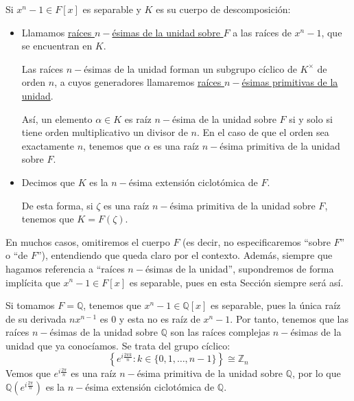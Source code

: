 \begin{definicion}
    Si $x^n-1\in F[x]$ es separable y $K$ es su cuerpo de descomposición:
    \begin{itemize}
        \item Llamamos \underline{raíces $n-$ésimas de la unidad sobre $F$} a las raíces de $x^n-1$, que se encuentran en $K$.

            Las raíces $n-$ésimas de la unidad forman un subgrupo cíclico de $K^\times$ de orden $n$, a cuyos generadores llamaremos \underline{raíces $n-$ésimas primitivas de la unidad}.

            Así, un elemento $\alpha\in K$ es raíz $n-$ésima de la unidad sobre $F$ si y solo si tiene orden multiplicativo un divisor de $n$. En el caso de que el orden sea exactamente $n$, tenemos que $\alpha$ es una raíz $n-$ésima primitiva de la unidad sobre $F$.
        \item Decimos que $K$ es la $n-$ésima extensión ciclotómica de $F$.

            De esta forma, si $\zeta$ es una raíz $n-$ésima primitiva de la unidad sobre $F$, tenemos que $K = F(\zeta)$.
    \end{itemize}
\end{definicion}

En muchos casos, omitiremos el cuerpo $F$ (es decir, no especificaremos ``sobre $F$'' o ``de $F$''), entendiendo que queda claro por el contexto. Además, siempre que hagamos referencia a ``raíces $n-$ésimas de la unidad'', supondremos de forma implícita que $x^n-1\in F[x]$ es separable, pues en esta Sección siempre será así.

\begin{ejemplo}
    Si tomamos $F=\mathbb{Q}$, tenemos que $x^n-1\in \mathbb{Q}[x]$ es separable, pues la única raíz de su derivada $nx^{n-1}$ es $0$ y esta no es raíz de $x^n-1$. Por tanto, tenemos que las raíces $n-$ésimas de la unidad sobre $\mathbb{Q}$ son las raíces complejas $n-$ésimas de la unidad que ya conocíamos. Se trata del grupo cíclico:
    \begin{equation*}
        \left\{e^{i\frac{2\pi k}{n}} : k \in \{0,1,\ldots,n-1\}\right\} \cong \mathbb{Z}_n
    \end{equation*}
    Vemos que $e^{i\frac{2\pi}{n}}$ es una raíz $n-$ésima primitiva de la unidad sobre $\mathbb{Q}$, por lo que $\mathbb{Q}\left(e^{i\frac{2\pi}{n}}\right)$ es la $n-$ésima extensión ciclotómica de $\mathbb{Q}$.
\end{ejemplo}


